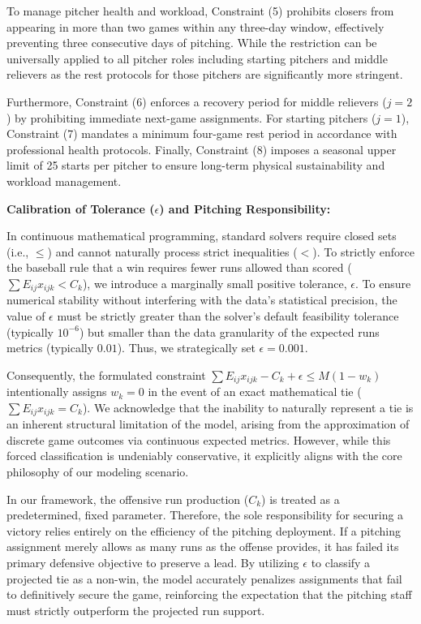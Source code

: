\documentclass[11pt, a4paper]{article}
\begin{document}
To manage pitcher health and workload, Constraint (5) prohibits closers from appearing in more than two games within any three-day window, effectively preventing three consecutive days of pitching. While the restriction can be universally applied to all pitcher roles including starting pitchers and middle relievers as the rest protocols for those pitchers are significantly more stringent.

Furthermore, Constraint (6) enforces a recovery period for middle relievers ($j = 2$) by prohibiting immediate next-game assignments. For starting pitchers ($j = 1$), Constraint (7) mandates a minimum four-game rest period in accordance with professional health protocols. Finally, Constraint (8) imposes a seasonal upper limit of 25 starts per pitcher to ensure long-term physical sustainability and workload management.

\textbf{Calibration of Tolerance ($\epsilon$) and Pitching Responsibility:}

In continuous mathematical programming, standard solvers require closed sets (i.e., $\le$) and cannot naturally process strict inequalities ($<$). To strictly enforce the baseball rule that a win requires fewer runs allowed than scored ($\sum E_{ij}x_{ijk} < C_k$), we introduce a marginally small positive tolerance, $\epsilon$. To ensure numerical stability without interfering with the data's statistical precision, the value of $\epsilon$ must be strictly greater than the solver's default feasibility tolerance (typically $10^{-6}$) but smaller than the data granularity of the expected runs metrics (typically $0.01$). Thus, we strategically set $\epsilon = 0.001$.

Consequently, the formulated constraint $\sum E_{ij}x_{ijk} - C_k + \epsilon \le M(1 - w_k)$ intentionally assigns $w_k = 0$ in the event of an exact mathematical tie ($\sum E_{ij}x_{ijk} = C_k$). We acknowledge that the inability to naturally represent a tie is an inherent structural limitation of the model, arising from the approximation of discrete game outcomes via continuous expected metrics. However, while this forced classification is undeniably conservative, it explicitly aligns with the core philosophy of our modeling scenario.

In our framework, the offensive run production ($C_k$) is treated as a predetermined, fixed parameter. Therefore, the sole responsibility for securing a victory relies entirely on the efficiency of the pitching deployment. If a pitching assignment merely allows as many runs as the offense provides, it has failed its primary defensive objective to preserve a lead. By utilizing $\epsilon$ to classify a projected tie as a non-win, the model accurately penalizes assignments that fail to definitively secure the game, reinforcing the expectation that the pitching staff must strictly outperform the projected run support.
\end{document}
